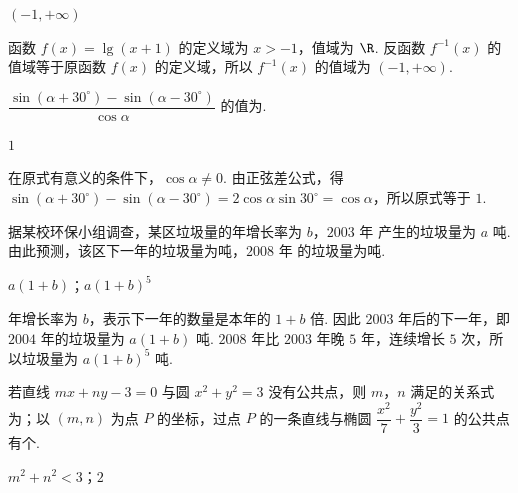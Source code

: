 \begin{answer}
\(\left(-1,+\infty\right)\)
\end{answer}

\begin{solution}
函数 \(f(x)=\lg(x+1)\) 的定义域为 \(x>-1\)，值域为 \(\R\). 反函数 \(f^{-1}(x)\) 的值域等于原函数 \(f(x)\) 的定义域，所以 \(f^{-1}(x)\) 的值域为 \(\left(-1,+\infty\right)\).
\end{solution}

\begin{problem}
\(\dfrac{\sin(\alpha+30^{\circ})-\sin(\alpha-30^{\circ})}{\cos\alpha}\) 的值为\fillinblank{}.
\end{problem}

\begin{answer}
\(1\)
\end{answer}

\begin{solution}
在原式有意义的条件下，\(\cos\alpha\ne0\). 由正弦差公式，得 \(\sin(\alpha+30^{\circ})-\sin(\alpha-30^{\circ})=2\cos\alpha\sin30^{\circ}=\cos\alpha\)，所以原式等于 \(1\).
\end{solution}

\begin{problem}
据某校环保小组调查，某区垃圾量的年增长率为 \(b\)，\(2003\text{ 年}\) 产生的垃圾量为 \(a\text{ 吨}\). 由此预测，该区下一年的垃圾量为\fillinblank{}\(\text{吨}\)，\(2008\text{ 年}\) 的垃圾量为\fillinblank{}\(\text{吨}\).
\end{problem}

\begin{answer}
\(a(1+b)\)；\(a(1+b)^5\)
\end{answer}

\begin{solution}
年增长率为 \(b\)，表示下一年的数量是本年的 \(1+b\) 倍. 因此 \(2003\) 年后的下一年，即 \(2004\) 年的垃圾量为 \(a(1+b)\text{ 吨}\). \(2008\) 年比 \(2003\) 年晚 \(5\) 年，连续增长 \(5\) 次，所以垃圾量为 \(a(1+b)^5\text{ 吨}\).
\end{solution}

\begin{problem}
若直线 \(mx+ny-3=0\) 与圆 \(x^2+y^2=3\) 没有公共点，则 \(m\)，\(n\) 满足的关系式为\fillinblank{}；以 \((m,n)\) 为点 \(P\) 的坐标，过点 \(P\) 的一条直线与椭圆 \(\dfrac{x^2}{7}+\dfrac{y^2}{3}=1\) 的公共点有\fillinblank{}\(\text{个}\).
\end{problem}

\begin{answer}
\(m^2+n^2<3\)；\(2\)
\end{answer}

